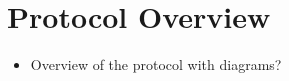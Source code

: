 \chapter*{Protocol Overview}

\begin{itemize}
\item Overview of the protocol with diagrams?
\end{itemize}
